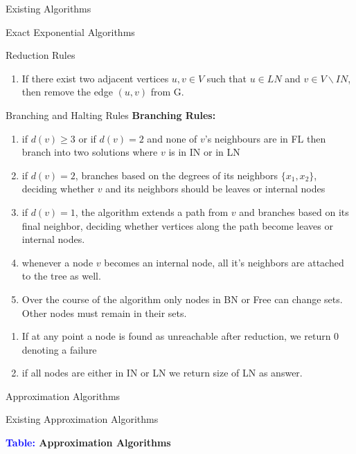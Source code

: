 \documentclass[xcolor=svgnames]{beamer}
\begin{document}
\begin{section}{Existing Algorithms}
\begin{subsection}{Exact Exponential Algorithms}
\begin{frame}{Reduction Rules}
\begin{enumerate}[<+->]
                \item If there exist two adjacent vertices $u, v \in V$ such that $u \in LN$ and $v \in V \backslash IN$, then remove the edge $(u, v)$ from G.
            \end{enumerate}
        \end{frame}
        \begin{frame}{Branching and Halting Rules}
                \small
                \textcolor{mqdeepred}{\textbf{\large Branching Rules:}}
                \begin{enumerate}[<+->]
                    \item if $d(v) \geq 3$ or if $d(v) = 2$ and none of $v$'s neighbours are in FL then branch into two solutions where $v$ is in IN or in LN 
                    \item if $d(v)=2$,  branches based on the degrees of its neighbors $\{x_1,x_2\}$, deciding whether $v$ and its neighbors should be leaves or internal nodes
                    \item if $d(v)=1$, the algorithm extends a path from $v$ and branches based on its final neighbor, deciding whether vertices along the path become leaves or internal nodes.
                    \item whenever a node $v$ becomes an internal node, all it's neighbors are attached to the tree as well.
                    \item Over the course of the algorithm only nodes in BN or Free can change sets. Other nodes must remain in their sets.
                \end{enumerate}
                \begin{enumerate}[<+->]
                    \item If at any point a node is found as unreachable after reduction, we return 0 denoting a failure
                    \item if all nodes are either in IN or LN we return size of LN as answer. 
                \end{enumerate}
        \end{frame}
    \end{subsection}
    \begin{subsection}{Approximation Algorithms}
        \begin{frame}{Existing Approximation Algorithms}
            \begin{center}
    \textbf{\textcolor{blue}{Table:} Approximation Algorithms}
\end{center}


\end{frame}
\end{subsection}
\end{section}
\end{document}
